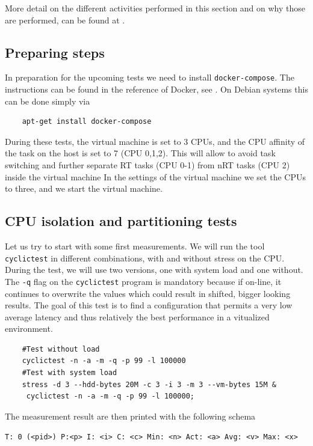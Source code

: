 \documentclass[]{scrartcl}
\begin{document}
More detail on the different activities performed in this section and on why those are performed, can be found at \cite{lrt01}.

\subsection{Preparing steps}

In preparation for the upcoming tests we need to install \texttt{docker-compose}.
The instructions can be found in the reference of Docker, see \cite{docker05}. 
On Debian systems this can be done simply via 

\begin{verbatim}
	apt-get install docker-compose
\end{verbatim}

During these tests, the virtual machine is set to 3 CPUs, and the CPU affinity of the task on the host is set to 7 (CPU 0,1,2). This will allow to avoid task switching and further separate RT tasks (CPU 0-1) from nRT tasks (CPU 2) inside the virtual machine
In the settings of the virtual machine we set the CPUs to three, and we start the virtual machine.  

\subsection{CPU isolation and partitioning tests}

Let us try to start with some first measurements. We will run the tool \texttt{cyclictest} in different combinations, with and without stress on the CPU. 
During the test, we will use two versions, one with system load and one without. The \texttt{-q} flag on the \texttt{cyclictest} program is mandatory because if on-line, it continues to overwrite the values which could result in shifted, bigger looking results. 
The goal of this test is to find a configuration that permits a very low average latency and thus relatively the best performance in a vitualized environment.

\begin{verbatim}
	#Test without load
	cyclictest -n -a -m -q -p 99 -l 100000
	#Test with system load
	stress -d 3 --hdd-bytes 20M -c 3 -i 3 -m 3 --vm-bytes 15M &
	 cyclictest -n -a -m -q -p 99 -l 100000;
\end{verbatim}

The measurement result are then printed with the following schema
\bigskip

\noindent \small \texttt{T: 0 (<pid>) P:<p> I: <i> C: <c> Min: <n> Act: <a> Avg: <v> Max: <x>}
\bigskip
\end{document}
